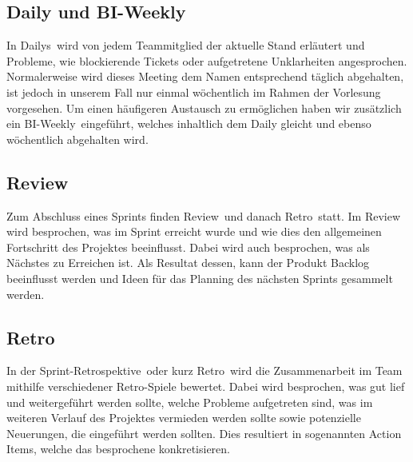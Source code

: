 \subsection{Daily und BI-Weekly}
In \glqq Dailys\grqq~wird von jedem Teammitglied der aktuelle Stand erläutert und Probleme, wie blockierende Tickets oder aufgetretene 
Unklarheiten angesprochen. Normalerweise wird dieses Meeting dem Namen entsprechend täglich abgehalten, ist jedoch in unserem Fall nur einmal 
wöchentlich im Rahmen der Vorlesung vorgesehen. Um einen häufigeren Austausch zu ermöglichen haben wir zusätzlich ein 
\glqq BI-Weekly\grqq~eingeführt, welches inhaltlich dem Daily gleicht und ebenso wöchentlich abgehalten wird.

\subsection{Review}
Zum Abschluss eines Sprints finden \glqq Review\grqq~und danach \glqq Retro\grqq~statt. Im Review wird besprochen, was im Sprint erreicht 
wurde und wie dies den allgemeinen Fortschritt des Projektes beeinflusst. Dabei wird auch besprochen, was als Nächstes zu Erreichen ist. 
Als Resultat dessen, kann der Produkt Backlog beeinflusst werden und Ideen für das Planning des nächsten Sprints gesammelt werden. 

\subsection{Retro}
In der \glqq Sprint-Retrospektive\grqq~oder kurz \glqq Retro\grqq~wird die Zusammenarbeit im Team mithilfe verschiedener Retro-Spiele bewertet. 
Dabei wird besprochen, was gut lief und weitergeführt werden sollte, welche Probleme aufgetreten sind, was im weiteren Verlauf des Projektes 
vermieden werden sollte sowie potenzielle Neuerungen, die eingeführt werden sollten. Dies resultiert in sogenannten Action Items, welche das 
besprochene konkretisieren.

